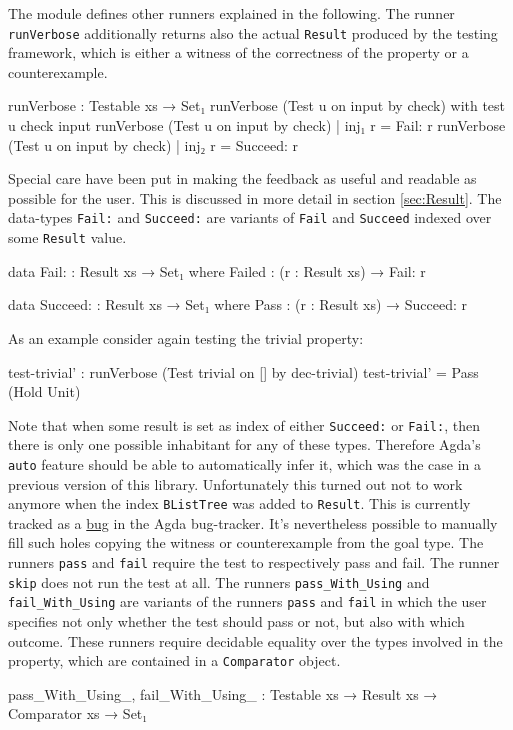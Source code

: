 \documentclass[10pt,a4paper]{article}
\begin{document}
The module defines other runners explained in the following.
The runner \texttt{runVerbose} additionally returns also the actual \texttt{Result} produced by the testing framework, which is either a witness of the correctness of the property or a counterexample.
\begin{code}
runVerbose : Testable xs → Set₁
runVerbose (Test u on input by check) with test u check input
runVerbose (Test u on input by check) | inj₁ r = Fail: r
runVerbose (Test u on input by check) | inj₂ r = Succeed: r
\end{code}
Special care have been put in making the feedback as useful and readable as possible for the user. This is discussed in more detail in section 	\ref{sec:Result}.
The data-types \texttt{Fail:} and \texttt{Succeed:} are variants of \texttt{Fail} and \texttt{Succeed} indexed over some \texttt{Result} value.
\begin{code}
data Fail: : Result xs → Set₁ where
  Failed : (r : Result xs) → Fail: r

data Succeed: : Result xs → Set₁ where
  Pass : (r : Result xs) → Succeed: r
\end{code}
As an example consider again testing the trivial property:
\begin{code}
test-trivial' : runVerbose (Test trivial on [] by dec-trivial)
test-trivial' = Pass (Hold Unit)
\end{code}
Note that when some result is set as index of either \texttt{Succeed:} or \texttt{Fail:}, then there is only one possible inhabitant for any of these types. Therefore Agda's \texttt{auto} feature should be able to automatically infer it, which was the case in a 	previous version of this library. 
Unfortunately this turned out not to work anymore when the index \texttt{BListTree} was added to \texttt{Result}. This is currently tracked as a \href{http://code.google.com/p/Agda/issues/detail?id=1223}{bug} in the Agda bug-tracker. It's nevertheless possible to manually fill such holes copying the witness or counterexample from the goal type.
The runners \texttt{pass} and \texttt{fail} require the test to respectively pass and fail. The runner \texttt{skip} does not run the test at all.
The runners \texttt{pass\_With\_Using} and \texttt{fail\_With\_Using} are variants of the runners \texttt{pass} and \texttt{fail} in which the user specifies not only whether the test should pass or not, but also with which outcome.
These runners require decidable equality over the types involved in the property, which are contained in a \texttt{Comparator} object.
\begin{code}
pass_With_Using_, fail_With_Using_ : Testable xs → Result xs → 
                                     Comparator xs → Set₁
\end{code}
\end{document}
